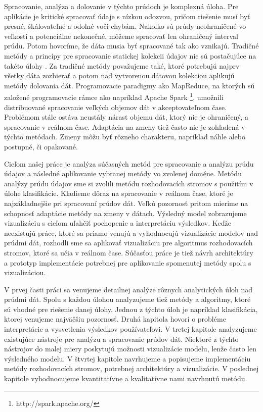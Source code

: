 \par
Spracovanie, analýza a dolovanie v týchto prúdoch je komplexná úloha. Pre aplikácie je kritické spracovať údaje s nízkou odozvou, pričom riešenie musí byť presné, škálovateľné a odolné voči chybám. Nakoľko sú prúdy neohraničené vo veľkosti a potenciálne nekonečné, môžeme spracovať len ohraničený interval prúdu. Potom hovoríme, že dáta musia byť spracované tak ako vznikajú. Tradičné metódy a princípy pre spracovanie statickej kolekcii údajov nie sú postačujúce na takéto úlohy \citep{krempl2014open, han2011data}. Za tradičné metódy považujeme také, ktoré potrebujú najprv všetky dáta zozbierať a potom nad vytvorenou dátovou kolekciou aplikujú metódy dolovania dát. Programovacie paradigmy ako MapReduce, na ktorých sú založené programovacie rámce ako napríklad Apache Spark \footnote{http://spark.apache.org/}, umožnili distribuované spracovanie veľkých objemov dát v akceptovateľnom čase. Problémom stále ostáva neustály nárast objemu dát, ktorý nie je ohraničený, a spracovanie v reálnom čase. Adaptácia na zmeny tiež často nie je zohľadená v týchto metódach. Zmeny môžu byť rôzneho charakteru, napríklad náhle alebo postupné, či opakované.
\par
Cieľom našej práce je analýza súčasných metód pre spracovanie a analýzu prúdu údajov a následné aplikovanie vybranej metódy vo zvolenej doméne. Metódu analýzy prúdu údajov sme si zvolili metódu rozhodovacích stromov s použitím v úlohe klasifikácie. Kladieme dôraz na spracovanie v reálnom čase, ktoré je najzákladnejšie pri spracovaní prúdov dát. Veľkú pozornosť pritom mierime na schopnosť adaptácie metódy na zmeny v dátach. Výsledný model zobrazujeme vizualizáciu s cieľom uľahčiť pochopenie a interpretáciu výsledkov. Keďže neexistujú práce, ktoré sa priamo venujú a vyhodnocujú vizualizácie modelov nad prúdmi dát, rozhodli sme sa aplikovať vizualizáciu pre algoritmus rozhodovacích stromov, ktoré sa učia v reálnom čase. Súčasťou práce je tiež návrh architektúry a prototyp implementácie potrebnej pre aplikovanie spomenutej metódy spolu s vizualizáciou.
\par
V prvej časti práci sa venujeme detailnej analýze rôznych analytických úloh nad prúdmi dát. Spolu s každou úlohou analyzujeme tiež metódy a algoritmy, ktoré sú vhodné pre riešenie danej úlohy. Jednou z týchto úloh je napríklad klasifikácia, ktorej venujeme	najväčšiu pozornosť. Druhá kapitola hovorí o probléme interpretácie a vysvetlenia výsledkov používateľovi. V tretej kapitole analyzujeme existujúce nástroje pre analýzu a spracovanie prúdov dát. Niektoré z týchto nástrojov do malej miery poskytujú možnosti vizualizácie modelu, lenže často len výsledného modelu. V štvrtej kapitole navrhujeme a popisujeme implementáciu metódy rozhodovacích stromov, potrebnej architektúry a vizualizácie. V poslednej kapitole vyhodnocujeme kvantitatívne a kvalitatívne nami navrhnutú metódu.